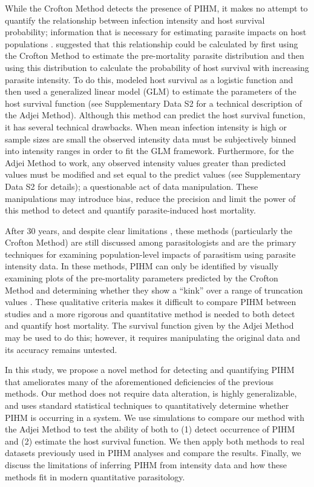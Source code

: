 \documentclass[12pt, a4paper]{article}
\begin{document}
While the Crofton Method detects the presence of PIHM, it makes no attempt to
quantify the relationship between infection intensity and host survival
probability; information that is necessary for estimating parasite impacts on host populations \citep{AndersonandMay1978,Tompkins2002}. \cite{Adjei1986}
suggested that this relationship could be calculated by first using the Crofton
Method to estimate the pre-mortality parasite distribution and then using this
distribution to calculate the probability of host survival with increasing
parasite intensity. To do this, \cite{Adjei1986} modeled host survival as a
logistic function and then used a generalized linear model (GLM) to estimate
the parameters of the host survival function (see Supplementary Data S2 for a technical
description of the Adjei Method).  Although this method can predict the host survival function, it has several technical drawbacks. When mean infection intensity is high or sample sizes
are small the observed intensity data must be subjectively binned into
intensity ranges in order to fit the GLM framework. Furthermore, for the Adjei
Method to work, any observed intensity values greater than predicted values
must be modified and set equal to the predict values (see Supplementary Data S2 for
details); a questionable act of data manipulation. These manipulations may introduce bias, reduce the precision and
limit the power of this method to detect and quantify parasite-induced host
mortality.

After 30 years, and despite clear limitations \citep{McCallum2000a}, these
methods (particularly the Crofton Method) are still discussed among
parasitologists and are the primary techniques for examining population-level
impacts of parasitism using parasite intensity data. In these methods, PIHM can only be identified by visually examining plots of the pre-mortality parameters predicted by the Crofton Method and determining whether they show a ``kink'' over a range of truncation values \citep[Fig. \ref{fig:crofton}B;][]{Lester1984,Ferguson2011}. These qualitative criteria makes it difficult to compare PIHM between studies and a more rigorous and quantitative method is needed to both detect and quantify host mortality. The survival function given by the Adjei
Method may be used to do this; however, it requires manipulating the
original data and its accuracy remains untested.

In this study, we propose a novel method for detecting and quantifying PIHM that ameliorates many of the aforementioned deficiencies of the previous methods. Our method does not require data alteration, is highly generalizable, and uses standard statistical techniques to quantitatively determine whether PIHM is occurring in a system.  We
use simulations to compare our method with the Adjei
Method to test the ability of both to (1) detect occurrence of PIHM and (2) estimate the host survival function.  We then
apply both methods to real datasets previously used in PIHM analyses and
compare the results. Finally, we discuss the limitations of inferring PIHM
from intensity data and how these methods fit in modern quantitative parasitology.
\end{document}
